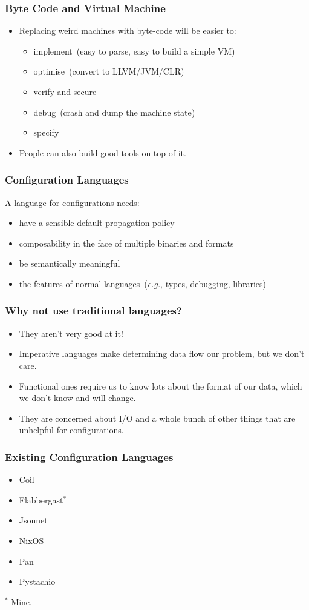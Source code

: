 \documentclass{beamer}
\begin{document}
\begin{frame}\frametitle{Byte Code and Virtual Machine}
\begin{itemize}
\item Replacing weird machines with byte-code will be easier to:
\begin{itemize}
\item implement~(easy to parse, easy to build a simple VM)
\item optimise~(convert to LLVM/JVM/CLR)
\item verify and secure
\item debug~(crash and dump the machine state)
\item specify
\end{itemize}
\item People can also build good tools on top of it.
\end{itemize}
\end{frame}


\begin{frame}\frametitle{Configuration Languages}
A language for configurations needs:
\begin{itemize}
\item have a sensible default propagation policy
\item composability in the face of multiple binaries and formats
\item be semantically meaningful
\item the features of normal languages~(\emph{e.g.}, types, debugging, libraries)
\end{itemize}
\end{frame}

\begin{frame}\frametitle{Why not use traditional languages?}
\begin{itemize}
\item They aren't very good at it!
\item Imperative languages make determining data flow our problem, but we don't care.
\item Functional ones require us to know lots about the format of our data, which we don't know and will change.
\item They are concerned about I/O and a whole bunch of other things that are unhelpful for configurations.
\end{itemize}
\end{frame}

\begin{frame}\frametitle{Existing Configuration Languages}
\begin{itemize}
\item Coil
\item Flabbergast$^*$
\item Jsonnet
\item NixOS
\item Pan
\item Pystachio
\end{itemize}
$^*$ Mine.
\end{frame}
\end{document}
